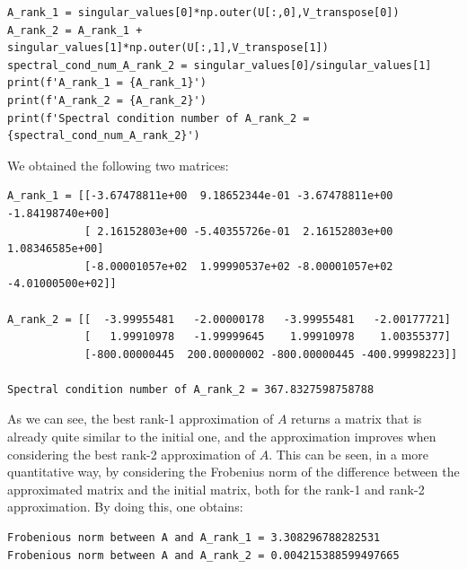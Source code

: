\documentclass[a4paper,11pt]{article}
\begin{document}
\begin{verbatim}
A_rank_1 = singular_values[0]*np.outer(U[:,0],V_transpose[0])
A_rank_2 = A_rank_1 + singular_values[1]*np.outer(U[:,1],V_transpose[1])
spectral_cond_num_A_rank_2 = singular_values[0]/singular_values[1]
print(f'A_rank_1 = {A_rank_1}')
print(f'A_rank_2 = {A_rank_2}')
print(f'Spectral condition number of A_rank_2 = {spectral_cond_num_A_rank_2}')
\end{verbatim}

\noindent We obtained the following two matrices:

\begin{verbatim}
A_rank_1 = [[-3.67478811e+00  9.18652344e-01 -3.67478811e+00 -1.84198740e+00]
            [ 2.16152803e+00 -5.40355726e-01  2.16152803e+00  1.08346585e+00]
            [-8.00001057e+02  1.99990537e+02 -8.00001057e+02 -4.01000500e+02]]

A_rank_2 = [[  -3.99955481   -2.00000178   -3.99955481   -2.00177721]
            [   1.99910978   -1.99999645    1.99910978    1.00355377]
            [-800.00000445  200.00000002 -800.00000445 -400.99998223]]
            
Spectral condition number of A_rank_2 = 367.8327598758788
\end{verbatim}

\noindent As we can see, the best rank-1 approximation of $A$ returns a matrix that is already quite similar to the initial one, and the approximation improves when considering the best rank-2 approximation of $A$. This can be seen, in a more quantitative way, by considering the Frobenius norm of the difference between the approximated matrix and the initial matrix, both for the rank-1 and rank-2 approximation. By doing this, one obtains:

\begin{verbatim}
Frobenious norm between A and A_rank_1 = 3.308296788282531
Frobenious norm between A and A_rank_2 = 0.004215388599497665
\end{verbatim}
\end{document}
